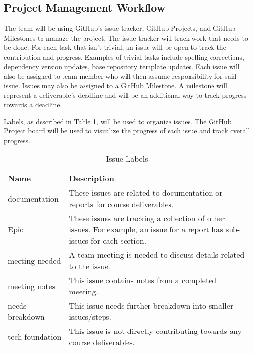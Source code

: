 \documentclass{article}
\begin{document}
\subsection{Project Management Workflow}

The team will be using GitHub's issue tracker, GitHub Projects, and GitHub Milestones to manage the
project. The issue tracker will track work that needs to be done. For each task that isn't trivial,
an issue will be open to track the contribution and progress. Examples of trivial tasks include
spelling corrections, dependency version updates, base repository template updates. Each issue will
also be assigned to team member who will then assume responsibility for said issue. Issues may also
be assigned to a GitHub Milestone. A milestone will represent a deliverable's deadline and will be
an additional way to track progress towards a deadline.

Labels, as described in Table \ref{issueLabels}, will be used to organize issues. The GitHub
Project board will be used to visualize the progress of each issue and track overall progress.

\begin{table}[H]
	\centering
	\caption{Issue Labels}
	\vspace{5pt}
	\begin{tabular}{|p{}|p{}|}
		\hline
		\textbf{Name}   & \textbf{Description}                                                                       \\
		\hline
		documentation   & These issues are related to documentation or reports for course deliverables.              \\
		\hline
		Epic            & These issues are tracking a collection of other issues. For example, an issue for a report
		has sub-issues for each section.                                                                             \\
		\hline
		meeting needed  & A team meeting is needed to discuss details related to the issue.                          \\
		\hline
		meeting notes   & This issue contains notes from a completed meeting.                                        \\
		\hline
		needs breakdown & This issue needs further breakdown into smaller issues/steps.                              \\
		\hline
		tech foundation & This issue is not directly contributing towards any course deliverables.                   \\
		\hline
	\end{tabular}

	\label{issueLabels}
\end{table}
\end{document}
